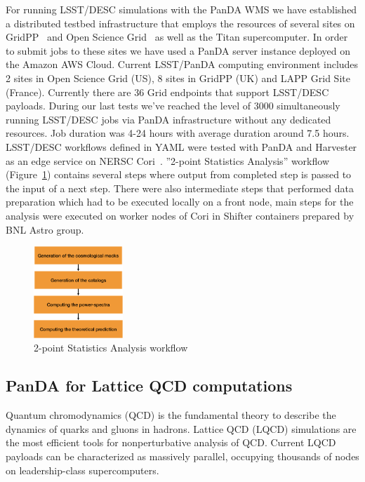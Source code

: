 \documentclass{webofc}
\begin{document}
For running LSST/DESC simulations with the PanDA WMS we have established a distributed testbed infrastructure that employs the resources of several sites on GridPP~\cite{GridPP_Collaboration_2005} and Open Science Grid~\cite{Pordes_2007} as well as the Titan supercomputer. In order to submit jobs to these sites we have used a PanDA server instance deployed on the Amazon AWS Cloud. 
Current LSST/PanDA computing environment includes 2 sites in Open Science Grid (US), 8 sites in GridPP (UK) and LAPP Grid Site (France). 
Currently there are 36 Grid endpoints that support LSST/DESC payloads. During our last tests we've reached the level of 3000 simultaneously running LSST/DESC jobs via PanDA infrastructure without any dedicated resources. 
Job duration was 4-24 hours with average duration around 7.5 hours.
LSST/DESC workflows defined in YAML were tested with PanDA and Harvester as an edge service on NERSC Cori~\cite{NERSC_Cori}. ''2-point Statistics Analysis'' workflow (Figure~\ref{fig:lsst_desc_2pt_stats}) contains several steps where output from completed step is passed to the input of a next step. There were also intermediate steps that performed data preparation which had to be executed locally on a front node, main steps for the analysis were executed on worker nodes of Cori in Shifter containers prepared by BNL Astro group.



\begin{figure}
  \centering
  \includegraphics[width=0.30\textwidth]{figures/LSST_2point_statistics.png}
  \caption{2-point Statistics Analysis workflow}
  \label{fig:lsst_desc_2pt_stats}
\end{figure}


\subsection{PanDA for Lattice QCD computations} \label{section_lqcd}

Quantum chromodynamics (QCD) is the fundamental theory to describe the dynamics of quarks and gluons in hadrons.
Lattice QCD (LQCD) simulations are the most efficient tools for nonperturbative analysis of QCD.
Current LQCD payloads can be characterized as massively parallel, occupying thousands of nodes on leadership-class supercomputers. 
\end{document}
